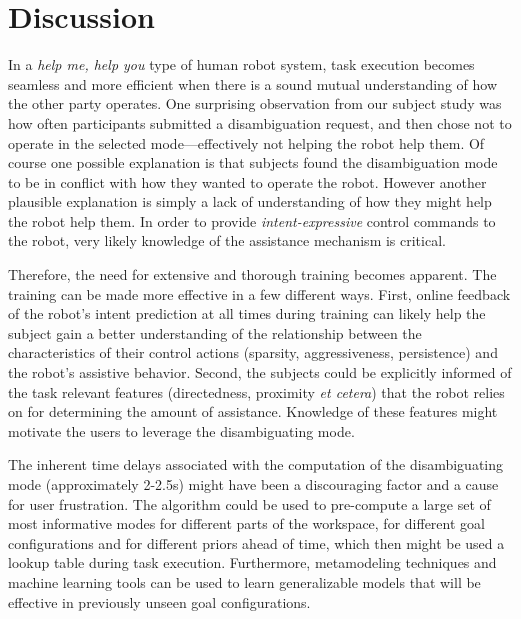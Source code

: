 %
\section{Discussion}\label{sec:discussions}
 
 
 In a \textit{help me, help you} type of human robot system, task execution becomes seamless and more efficient when there is a sound mutual understanding of how the other party operates. One surprising observation from our subject study was how often participants submitted a disambiguation request, and then chose not to operate in the selected mode---effectively not helping the robot help them. Of course one possible explanation is that subjects found the disambiguation mode to be in conflict with how they wanted to operate the robot. However another plausible explanation is simply a lack of understanding of how they might help the robot help them. In order to provide \textit{intent-expressive} control commands to the robot, very likely knowledge of the assistance mechanism is critical. 
 
 Therefore, the need for extensive and thorough training becomes apparent.
 The training can be made more effective in a few different ways. First, online feedback of the robot's intent prediction at all times during training can likely help the subject gain a better understanding of the relationship between the characteristics of their control actions (sparsity, aggressiveness, persistence) and the robot's assistive behavior. Second, the subjects could be explicitly informed of the task relevant features (directedness, proximity \textit{et cetera}) that the robot relies on for determining the amount of assistance. Knowledge of these features might motivate the users to leverage the disambiguating mode. 
 
 The inherent time delays associated with the computation of the disambiguating mode (approximately 2-2.5s) might have been a discouraging factor and a cause for user frustration. The algorithm could be used to pre-compute a large set of most informative modes for different parts of the workspace, for different goal configurations and for different priors ahead of time, which then might be used a lookup table during task execution. Furthermore, metamodeling techniques and machine learning tools can be used to learn generalizable models that will be effective in previously unseen goal configurations. 
 
